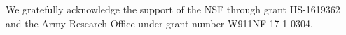 We gratefully acknowledge the support of the NSF through grant IIS-1619362 and the Army Research Office under grant number W911NF-17-1-0304.
